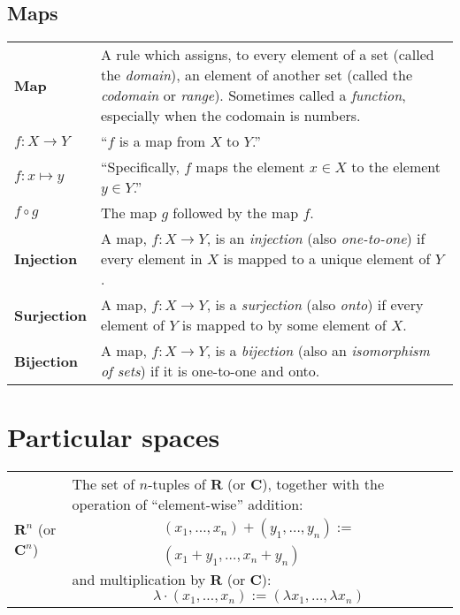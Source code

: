\documentclass[10pt, a4paper, twocolumn]{article}
\newcommand{\defn}[1]{\textbf{\textsf{#1}}}
\newcommand{\set}[1]{\mathbold{#1}}
\begin{document}
\newpage
\subsection*{Maps}
\begin{tabularx}{\columnwidth}{@{}p{}>{\raggedright\arraybackslash}X@{}}
  \toprule
  \defn{Map} & A rule which assigns, to every element of a set (called the \emph{domain}), an element of another set (called the \emph{codomain} or \emph{range}). Sometimes called a \emph{function}, especially when the codomain is numbers. \\

  $f\colon X\to Y$   & ``$f$ is a map from $X$ to $Y$.'' \\

  $f\colon x \mapsto y$  & ``Specifically, $f$ maps the element $x \in X$ to the
  element $y \in Y$.'' \\
  $f \circ g$    & The map $g$ followed by the map $f$. \\

  \defn{Injection} & A map, $f\colon X \to Y$, is an \emph{injection} (also \emph{one-to-one}) if every element in $X$ is mapped to a unique element of $Y$. \\

  \defn{Surjection} & A map, $f\colon X \to Y$, is a \emph{surjection} (also \emph{onto}) if every element of $Y$ is mapped to by some element of $X$. \\

  \defn{Bijection} & A map, $f\colon X \to Y$, is a \emph{bijection} (also an \emph{isomorphism of sets}) if it is one-to-one and onto.   
\end{tabularx}

\section*{Particular spaces}
\begin{tabularx}{\columnwidth}{@{}p{}>{\raggedright\arraybackslash}X@{}}
  \toprule
  $\set{R}^n$ (or $\set{C}^n$) & The set of $n$-tuples of $\set{R}$ (or $\set{C}$), together with the operation of “element-wise” addition:
  \begin{multline*}
      (x_1, \dotsc, x_n) + (y_1, \dotsc, y_n) := \\ (x_1+y_1, \dotsc, x_n+y_n) 
  \end{multline*}
  and multiplication by $\set{R}$ (or $\set{C}$):
  \begin{equation*}
    \lambda \cdot (x_1, \dotsc, x_n) := (\lambda x_1, \dotsc, \lambda x_n) 
  \end{equation*}
\end{tabularx}
\end{document}
